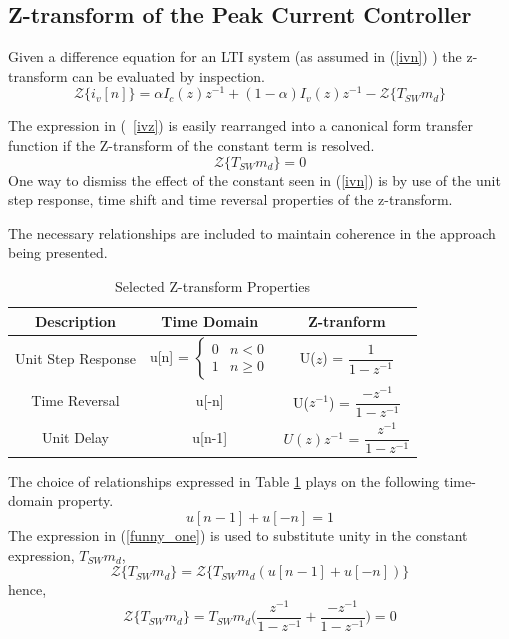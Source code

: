 \documentclass[conference]{IEEEtran}
\begin{document}
\subsection{Z-transform of the Peak Current Controller}
Given a difference equation for an LTI system (as assumed in (\ref{ivn}) ) the z-transform can be evaluated by inspection.  
\begin{equation}
\mathcal{Z} \{ i_v[n] \} =  \alpha I_c(z) z^{-1} + ( 1 - \alpha ) I_v (z) z^{-1} - \mathcal{Z} \{T_{SW}m_d\}  \label{ivz}
\end{equation}

The expression in (~\ref{ivz}) is easily rearranged into a canonical form transfer function if the Z-transform of the constant term is resolved.
\begin{equation}
 \mathcal{Z} \{ T_{SW} m_d \} = 0 \label{zconst}
\end{equation}
One way to dismiss the effect of the constant seen in (\ref{ivn}) is by use of the unit step response, time shift and time reversal properties of the z-transform.

The necessary relationships are included to maintain coherence in the approach being presented.

\begin{table}[H]
	\caption{Selected Z-transform Properties}
	\begin{center}
		\begin{tabular}{|c|c|c|}
			\hline
			\textbf{Description}& \textbf{Time Domain}& \textbf{Z-tranform}\\
			\hline
			Unit Step Response & 
			u[n] =
			$ \begin{cases} 
				0 & n < 0 \\
				1 & n \geq 0 
			\end{cases} $ 
			 & U($ \mathit{z} $) = $\dfrac{1}{1-z^{-1}}$ \\
			\hline
			
			
			Time Reversal& u[-n]& U($ \mathit{z^{-1}} $) = $\dfrac{-z^{-1}}{1-z^{-1}}$  \\
			\hline
			Unit Delay & u[n-1] & $U( \mathit{z} )\mathit{z^{-1}}$ = $\dfrac{z^{-1}}{1-z^{-1}}$  \\
			\hline

		\end{tabular}
		\label{tabun}
	\end{center}
\end{table}

The choice of relationships expressed in Table \ref{tabun} plays on the following time-domain property. 
\begin{equation}
u[n-1] + u[-n] = 1 \label{funny_one}
\end{equation}
The expression in (\ref{funny_one}) is used to substitute unity in the constant expression, $ T_{SW} m_d $,
\begin{equation}
	\mathcal{Z}\{ T_{SW} m_d \} = 
	\mathcal{Z}\{ T_{SW} m_d (u[n-1] + u[-n]) \}
\end{equation}
hence,
\begin{equation}
\mathcal{Z}\{ T_{SW} m_d \} = T_{SW} m_d \bigg( \dfrac{z^{-1}}{1-z^{-1}} + \dfrac{-z^{-1}}{1-z^{-1}} \bigg) = 0
\end{equation}
\end{document}

